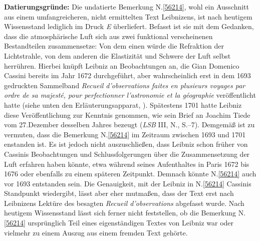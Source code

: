 \begin{ledgroup}%
\footnotesize%
\pstart%
\noindent%
\textbf{Datierungsgründe:}
Die undatierte Bemerkung N.\;\ref{56214}, wohl ein Ausschnitt aus einem umfangreicheren, nicht ermittelten Text Leibnizens, ist nach heutigem Wissensstand lediglich im Druck \textit{E} überliefert.
Befasst ist sie mit dem Gedanken, dass die atmosphärische Luft sich aus zwei funktional verscheinenen Bestandteilen zusammensetze: Von dem einen würde die Refraktion der Lichtstrahle, von dem anderen die Elastizität und Schwere der Luft selbst herrühren.
Hierbei knüpft Leibniz an Beobachtungen an, die Gian Domenico Cassini bereits im Jahr 1672 durchgeführt, aber wahrscheinlich erst in dem 1693 gedruckten Sammelband \textit{Recueil d’observations faites en plusieurs voyages par ordre de sa majesté, pour perfectionner l’astronomie et la géographie} veröffentlicht hatte (siehe unten den Erläuterungsapparat, ).\cite{02605}
Spätestens 1701 hatte Leibniz diese Veröffentlichung zur Kenntnis genommen, wie sein Brief an Joachim Tiede vom 27.\;Dezember desselben Jahres bezeugt (\textit{LSB} III, N., S.--7).\cite{02607}
Demgemäß ist zu vermuten, dass die Bemerkung N.\;\ref{56214} im Zeitraum zwischen 1693 und 1701 enstanden ist.
\pend%
\pstart%
Es ist jedoch nicht auszuschließen, dass Leibniz schon früher von Cassinis Beobachtungen und Schlussfolgerungen über die Zusammensetzung der Luft erfahren haben könnte, etwa während seines Aufenthaltes in Paris 1672 bis 1676 oder ebenfalls zu einem späteren Zeitpunkt.
Demnach könnte N.\;\ref{56214} auch vor 1693 entstanden sein.
Die Genauigkeit, mit der Leibniz in N.\;\ref{56214} Cassinis Standpunkt wiedergibt, lässt aber eher mutmaßen, dass der Text erst nach Leibnizens Lektüre des besagten \textit{Recueil d’observations}\cite{02607} abgefasst wurde.
\pend%
\pstart%
Nach heutigem Wissensstand lässt sich ferner nicht feststellen, ob die Bemerkung N.\;\ref{56214} ursprünglich Teil eines eigenständigen Textes von Leibniz war oder vielmehr zu einem Auszug aus einem fremden Text gehörte.
\pend%
\end{ledgroup}%
%
\frenchspacing%
\vspace{8mm}%
\newpage%
\normalsize%
\pstart%
\noindent%
